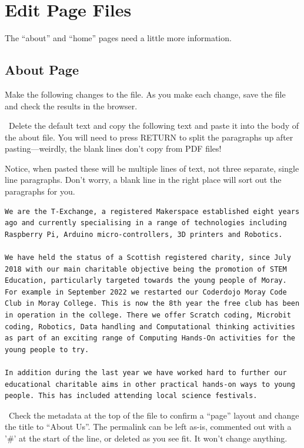 \section{Edit Page Files}

The ``about'' and ``home'' pages need a little more information.

\subsection{About Page}

Make the following  changes to the  file. As you make each change, save the file and check the results in the browser.

\lyxarrow{}~Delete the default text and copy the following text and paste it into the body of the about file. You will need to press RETURN to split the paragraphs up after pasting---weirdly, the blank lines don't copy from PDF files!

Notice, when pasted these will be multiple lines of text, not three separate, single line paragraphs. Don't worry, a blank line in the right place will sort out the paragraphs for you.


\begin{lstlisting}[style=myText]
We are the T-Exchange, a registered Makerspace established eight years ago and currently specialising in a range of technologies including Raspberry Pi, Arduino micro-controllers, 3D printers and Robotics.

We have held the status of a Scottish registered charity, since July 2018 with our main charitable objective being the promotion of STEM Education, particularly targeted towards the young people of Moray. For example in September 2022 we restarted our Coderdojo Moray Code Club in Moray College. This is now the 8th year the free club has been in operation in the college. There we offer Scratch coding, Microbit coding, Robotics, Data handling and Computational thinking activities as part of an exciting range of Computing Hands-On activities for the young people to try.

In addition during the last year we have worked hard to further our educational charitable aims in other practical hands-on ways to young people. This has included attending local science festivals.
\end{lstlisting}


\lyxarrow{}~Check the metadata at the top of the file to confirm a ``page'' layout and change the title to ``About Us''. The permalink can be left as-is, commented out with a '\#' at the start of the line, or deleted as you see fit. It won't change anything.

